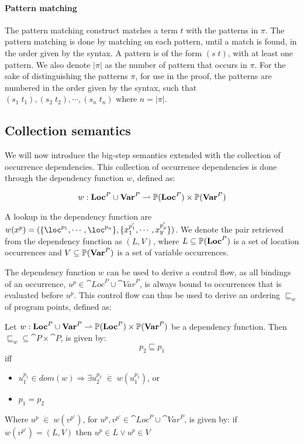 \documentclass[../../master.tex]{subfiles}
\begin{document}
\paragraph{Pattern matching}
The pattern matching construct matches a term $t$ with the patterns in $\pi$.
The pattern matching is done by matching on each pattern, until a match is found, in the order given by the syntax.
A pattern is of the form $(s\;t)$, with at least one pattern.
We also denote $|\pi|$ as the number of pattern that occurs in $\pi$.
For the sake of distinguishing the patterns $\pi$, for use in the proof, the patterns are numbered in the order given by the syntax, such that $(s_1\;t_1),(s_2\;t_2),\cdots,(s_n\;t_n)$ where $n=|\pi|$.

\subsection{Collection semantics}\label{sec:sem}
We will now introduce the big-step semantics extended with the collection of occurrence dependencies.
This collection of occurrence dependencies is done through the dependency function $w$, defined as:

$$w:\textbf{Loc}^P\cup\textbf{Var}^P\rightharpoonup\mathbb{P}(\textbf{Loc}^P)\times\mathbb{P}(\textbf{Var}^P)$$

A lookup in the dependency function are $w(x^p)=(\{\loc^{p_1},\cdots,\loc^{p_n}\},\{x_1^{p'_1},\cdots,x_y^{p'_y}\})$.
We denote the pair retrieved from the dependency function as $(L,V)$, where $L\subseteq\mathbb{P}(\textbf{Loc}^P)$ is a set of location occurrences and $V\subseteq\mathbb{P}(\textbf{Var}^P)$ is a set of variable occurrences.

The dependency function $w$ can be used to derive a control flow, as all bindings of an occurrence, $u^p\in\cat{Loc}^P\cup\cat{Var}^P$, is always bound to occurrences that is evaluated before $u^p$.
This control flow can thus be used to derive an ordering $\sqsubseteq_w$ of program points, defined as:


\begin{definition}[$\sqsubseteq_w$]
	Let $w:\textbf{Loc}^P\cup\textbf{Var}^P\rightharpoonup\mathbb{P}(\textbf{Loc}^P)\times\mathbb{P}(\textbf{Var}^P)$ be a dependency function.
	Then $\sqsubseteq_w\subseteq\cat{P}\times\cat{P}$, is given by:
	$$p_2\sqsubseteq p_1$$
	iff
	\begin{itemize}
		\item $u_1^{p_1}\in dom(w)\Rightarrow\exists u_2^{p_2}\;\dot{\in}\; w(u_1^{p_1})$, or
		\item $p_1=p_2$
	\end{itemize}
	Where $u^{p}\;\dot{\in}\;w(v^{p'})$, for $u^p,v^{p'}\in\cat{Loc}^P\cup\cat{Var}^P$, is given by:
	if $w(v^{p'})=(L,V)$ then $u^{p}\in L\vee u^{p}\in V$
\end{definition}
\end{document}
